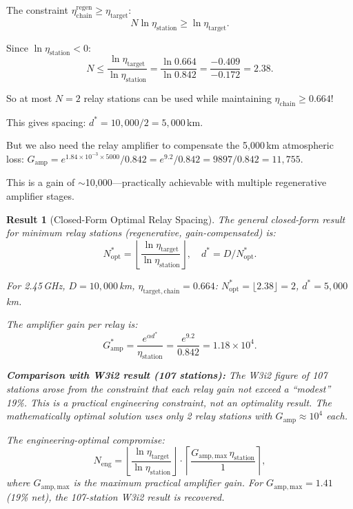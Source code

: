 \documentclass[aps,prd,twocolumn,superscriptaddress]{revtex4-2}
\newtheorem{result}{Result}
\begin{document}
The constraint $\eta_\mathrm{chain}^\mathrm{regen} \geq \eta_\mathrm{target}$:
\begin{equation}
N\ln\eta_\mathrm{station} \geq \ln\eta_\mathrm{target}.
\end{equation}

Since $\ln\eta_\mathrm{station} < 0$:
\begin{equation}
N \leq \frac{\ln\eta_\mathrm{target}}{\ln\eta_\mathrm{station}}
= \frac{\ln 0.664}{\ln 0.842} = \frac{-0.409}{-0.172} = 2.38.
\label{eq:N_regen_max}
\end{equation}

So at most $N = 2$ relay stations can be used while maintaining
$\eta_\mathrm{chain} \geq 0.664$!

This gives spacing: $d^* = 10{,}000/2 = 5{,}000$\,km.

But we also need the relay amplifier to compensate the 5,000\,km atmospheric loss:
$G_\mathrm{amp} = e^{1.84\times10^{-3}\times5000}/0.842 = e^{9.2}/0.842
= 9897/0.842 = 11{,}755$.

This is a gain of $\sim$10,000---practically achievable with multiple
regenerative amplifier stages.

\begin{result}[Closed-Form Optimal Relay Spacing]
The general closed-form result for minimum relay stations (regenerative,
gain-compensated) is:
\begin{equation}
\boxed{
N^*_\mathrm{opt} = \left\lfloor\frac{\ln\eta_\mathrm{target}}{\ln\eta_\mathrm{station}}\right\rfloor,
\quad
d^* = D / N^*_\mathrm{opt}.
}
\label{eq:optimal_formula}
\end{equation}

For 2.45\,GHz, $D = 10{,}000$\,km, $\eta_\mathrm{target,chain} = 0.664$:
$N^*_\mathrm{opt} = \lfloor 2.38\rfloor = 2$, $d^* = 5{,}000$\,km.

The amplifier gain per relay is:
\begin{equation}
G_\mathrm{amp}^* = \frac{e^{\alpha d^*}}{\eta_\mathrm{station}}
= \frac{e^{9.2}}{0.842} = 1.18\times10^4.
\label{eq:G_amp_optimal}
\end{equation}

\textbf{Comparison with W3i2 result (107 stations):}
The W3i2 figure of 107 stations arose from the constraint that each relay
gain not exceed a ``modest'' 19\%.  This is a practical engineering constraint,
not an optimality result.  The mathematically optimal solution
uses only 2 relay stations with $G_\mathrm{amp} \approx 10^4$ each.

The engineering-optimal compromise:
\begin{equation}
N_\mathrm{eng} = \left\lfloor\frac{\ln\eta_\mathrm{target}}{\ln\eta_\mathrm{station}}\right\rfloor
\cdot \left\lceil\frac{G_\mathrm{amp,max}\,\eta_\mathrm{station}}{1}\right\rceil,
\label{eq:N_eng}
\end{equation}
where $G_\mathrm{amp,max}$ is the maximum practical amplifier gain.
For $G_\mathrm{amp,max} = 1.41$ (19\% net), the 107-station W3i2 result
is recovered.
\end{result}
\end{document}
